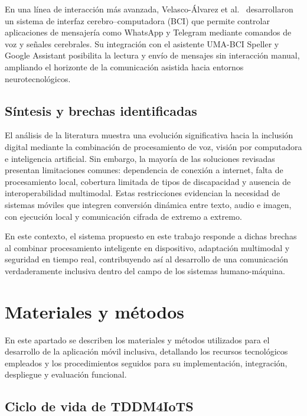 \documentclass[lettersize,journal]{IEEEtran}
\begin{document}
                En una línea de interacción más avanzada, Velasco-Álvarez et al.~\cite{VelascoAlvarez2021} desarrollaron un sistema de interfaz cerebro–computadora (BCI) que permite controlar aplicaciones de mensajería como WhatsApp y Telegram mediante comandos de voz y señales cerebrales. Su integración con el asistente UMA-BCI Speller y Google Assistant posibilita la lectura y envío de mensajes sin interacción manual, ampliando el horizonte de la comunicación asistida hacia entornos neurotecnológicos.
                    
        \subsection{Síntesis y brechas identificadas}
            El análisis de la literatura muestra una evolución significativa hacia la inclusión digital mediante la combinación de procesamiento de voz, visión por computadora e inteligencia artificial. Sin embargo, la mayoría de las soluciones revisadas presentan limitaciones comunes: dependencia de conexión a internet, falta de procesamiento local, cobertura limitada de tipos de discapacidad y ausencia de interoperabilidad multimodal. Estas restricciones evidencian la necesidad de sistemas móviles que integren conversión dinámica entre texto, audio e imagen, con ejecución local y comunicación cifrada de extremo a extremo.  
                
            En este contexto, el sistema propuesto en este trabajo responde a dichas brechas al combinar procesamiento inteligente en dispositivo, adaptación multimodal y seguridad en tiempo real, contribuyendo así al desarrollo de una comunicación verdaderamente inclusiva dentro del campo de los sistemas humano-máquina.
                    
    \section{Materiales y métodos}
    
        En este apartado se describen los materiales y métodos utilizados para el desarrollo de la aplicación móvil inclusiva, detallando los recursos tecnológicos empleados y los procedimientos seguidos para su implementación, integración, despliegue y evaluación funcional.

        \subsection{Ciclo de vida de TDDM4IoTS}
        
\end{document}
